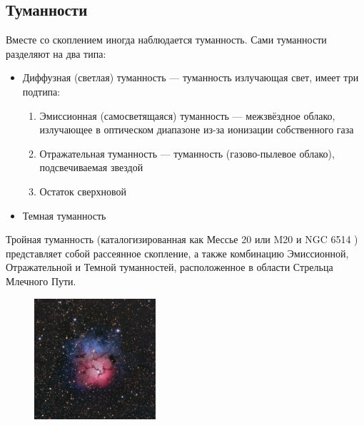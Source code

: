 \documentclass{beamer}
\begin{document}
    \subsection*{Туманности}
    \begin{frame}
        Вместе со скоплением иногда наблюдается туманность. Сами туманности разделяют на два типа:
        \begin{itemize}
            \item Диффузная (светлая) туманность --- туманность излучающая свет, имеет три подтипа:
            \begin{enumerate}
                \item Эмиссионная (самосветящаяся) туманность --- межзвёздное облако, излучающее в оптическом диапазоне из-за ионизации собственного газа
                \item Отражательная туманность --- туманность (газово-пылевое облако), подсвечиваемая звездой
                \item Остаток сверхновой
            \end{enumerate}
            \item Темная туманность
        \end{itemize}
    \end{frame}
    \begin{frame}
        Тройная туманность (каталогизированная как Мессье 20 или M20 и NGC 6514 ) представляет собой рассеянное скопление,
        а также комбинацию Эмиссионной, Отражательной и Темной туманностей, расположенное в области Стрельца Млечного Пути.
        \begin{figure}
            \centering
            \includegraphics[width=0.4\textwidth]{pictures/Nebula.jpg}
        \end{figure}
    \end{frame}
\end{document}
